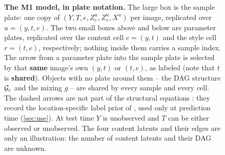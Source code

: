 \begin{figure}[H]
\caption{\textbf{The M1 model, in plate notation.} The large box is the sample plate: one copy of
$(Y,T,e,Z_c^u,Z_s^u,X^u)$ per image, replicated over $u=(y,t,e)$. The two small boxes above and 
below are parameter plates, replicated over the content cell $c=(y,t)$ and the style cell $r=(t,e)$,
respectively; nothing inside them carries a sample index. The arrow from a parameter plate into the
sample plate is selected by that \textbf{same} image's own $(y,t)$ or $(t,e)$, as labeled (note 
that $t$ is \textbf{shared}). Objects with no plate around them -- the DAG structure $\mathcal{G}_c$ and the 
mixing $g$ -- are shared by every sample and every cell.
The dashed arrows are not part of the structural equations 
: they
record the location-specific label prior of , used only at prediction time
(\cref{sec:use}). At test time $Y$ is unobserved and $T$ can be either observed or unobserved. 
The four content latents and their edges are only an illustration: the number of
content latents and their DAG are unknown.}
\label{fig:m1}
\end{figure}
